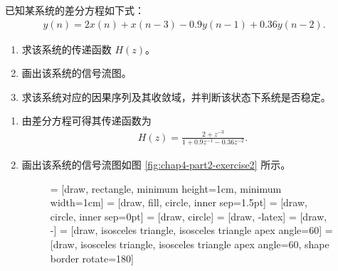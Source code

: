 \begin{exercise}
    已知某系统的差分方程如下式：
    \begin{align*}
        y(n) = 2x(n) + x(n - 3) - 0.9y(n - 1) + 0.36y(n - 2).
    \end{align*}
    \begin{enumerate}[label=(\arabic*)]
        \item 求该系统的传递函数 $H(z)$。
        \item 画出该系统的信号流图。
        \item 求该系统对应的因果序列及其收敛域，并判断该状态下系统是否稳定。
    \end{enumerate}
\end{exercise}

\begin{solution}
    \begin{enumerate}[label=(\arabic*)]
        \item 由差分方程可得其传递函数为
            \begin{align*}
                H(z) = \frac{2 + z^{-3}}{1 + 0.9z^{-1} - 0.36z^{-2}}.
            \end{align*}
        \item 画出该系统的信号流图如图 \ref{fig:chap4-part2-exercise2} 所示。
            \begin{figure}[H]
                \centering
                 = [draw, rectangle, minimum height=1cm, minimum width=1cm]
                 = [draw, fill, circle, inner sep=1.5pt]
                 = [draw, circle, inner sep=0pt]
                 = [draw, circle]
                 = [draw, -latex]
                 = [draw, -]
                 = [draw, isosceles triangle, isosceles triangle apex angle=60]
                 = [draw, isosceles triangle, isosceles triangle apex angle=60, shape border rotate=180]
\end{figure}
\end{enumerate}
\end{solution}
